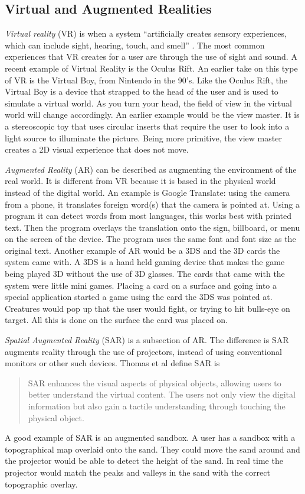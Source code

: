 \documentclass{sig-alternate}
\begin{document}
\subsection{Virtual and Augmented Realities}
\label{sec:Reality}
\textit{Virtual reality} (VR) is when a system ``artificially creates sensory experiences, which can include sight, hearing, touch, and smell'' \cite{VR}. The most common experiences that VR creates for a user are through the use of sight and sound. A recent example of Virtual Reality is the Oculus Rift. An earlier take on this type of VR is the Virtual Boy, from Nintendo in the 90's. Like the Oculus Rift, the Virtual Boy is a device that strapped to the head of the user and is used to simulate a virtual world. As you turn your head, the field of view in the virtual world will change accordingly. An earlier example would be the view master. It is a stereoscopic toy that uses circular inserts that require the user to look into a light source to illuminate the picture. Being more primitive, the view master creates a 2D visual experience that does not move.       

\textit{Augmented Reality} (AR) can be described as augmenting the environment of the real world. It is different from VR because it is based in the physical world instead of the digital world. An example is Google Translate: using the camera from a phone, it translates foreign word(s) that the camera is pointed at. Using a program it can detect words from most languages, this works best with printed text. Then the program overlays the translation onto the sign, billboard, or menu on the screen of the device. The program uses the same font and font size as the original text. Another example of AR would be a 3DS and the 3D cards the system came with. A 3DS is a hand held gaming device that makes the game being played 3D without the use of 3D glasses. The cards that came with the system were little mini games. Placing a card on a surface and going into a special application started a game using the card the 3DS was pointed at. Creatures would pop up that the user would fight, or trying to hit bulls-eye on target. All this is done on the surface the card was placed on.   

\textit{Spatial Augmented Reality} (SAR) is a subsection of AR. The difference is SAR augments reality through the use of projectors, instead of using conventional monitors or other such devices. Thomas et al \cite{3D} define SAR is 
\begin{quote}
SAR enhances the visual aspects of physical objects, allowing users to better understand the virtual content. The users not only view the digital information but also gain a tactile understanding through touching the physical object.
\end{quote} 
A good example of SAR is an augmented sandbox. A user has a sandbox with a topographical map overlaid onto the sand. They could move the sand around and the projector would be able to detect the height of the sand. In real time the projector would match the peaks and valleys in the sand with the correct topographic overlay. 
\end{document}
